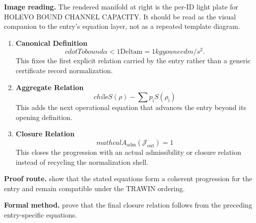\begin{samepage}
\noindent\begin{minipage}[t]{0.45\linewidth}
\vspace{0pt}
\raggedright
\scriptsize\textbf{Image reading.} The rendered manifold at right is the per-ID light plate for HOLEVO BOUND CHANNEL CAPACITY. It should be read as the visual companion to the entry's equation layer, not as a repeated template diagram.\par
\end{minipage}\hfill
\begin{minipage}[t]{0.53\linewidth}
\vspace*{-0.10in}
\raggedright
{}
\end{minipage}
\end{samepage}

\clearpage


\begin{enumerate}[leftmargin=1.6em,itemsep=9pt,topsep=6pt]
\item \textbf{Canonical Definition}
\[
cdot To bound \alpha < 1 \mathrm{Deltam} = 1 kg you need m/s^{2}.
\]
This fixes the first explicit relation carried by the entry rather than a generic certificate record normalization.

\item \textbf{Aggregate Relation}
\[
chi \mathrm{le} S(\rho) - \sum p_{\mathrm{i}} S(\rho_{\mathrm{i}})
\]
This adds the next operational equation that advances the entry beyond its opening definition.

\item \textbf{Closure Relation}
\[
mathcal{A}_{\mathrm{adm}}\!\left(\mathcal{J}_{\mathrm{out}}\right)=1
\]
This closes the progression with an actual admissibility or closure relation instead of recycling the normalization shell.
\end{enumerate}

\textbf{Proof route.} show that the stated equations form a coherent progression for the entry and remain compatible under the TRAWIN ordering.

\textbf{Formal method.} prove that the final closure relation follows from the preceding entry-specific equations.

\medskip
{}

